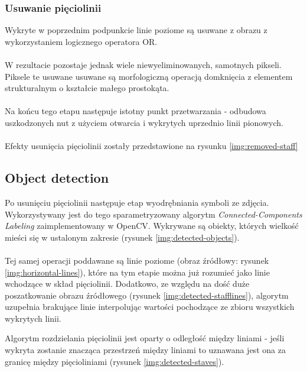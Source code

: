\documentclass[12pt, letterpaper]{article}
\begin{document}
\subsubsection{Usuwanie pięciolinii}
\label{subsec:staff-removal}
Wykryte w poprzednim podpunkcie linie poziome są usuwane z obrazu
z wykorzystaniem logicznego operatora OR.
\\
\\
W rezultacie pozostaje jednak wiele niewyeliminowanych, samotnych pikseli.
Piksele te usuwane usuwane są morfologiczną operacją domknięcia
z elementem strukturalnym o kształcie małego prostokąta.
\\
\\
Na końcu tego etapu następuje istotny punkt przetwarzania -
odbudowa uszkodzonych nut z użyciem otwarcia i wykrytych uprzednio linii pionowych.
\\
\\
Efekty usunięcia pięciolinii zostały przedstawione na
rysunku \ref{img:removed-staff}

\subsection{Object detection}
\label{sec:detection}
Po usunięciu pięciolinii następuje etap wyodrębniania symboli ze zdjęcia.
Wykorzystywany jest do tego sparametryzowany algorytm \emph{Connected-Components Labeling}
zaimplementowany w OpenCV.
Wykrywane są obiekty, których wielkość mieści się w ustalonym zakresie (rysunek \ref{img:detected-objects}).
\\
\\
Tej samej operacji poddawane są linie poziome (obraz źródłowy: rysunek \ref{img:horizontal-lines}),
które na tym etapie można już rozumieć jako linie wchodzące w skład pięciolinii.
Dodatkowo, ze względu na dość duże poszatkowanie obrazu źródłowego (rysunek \ref{img:detected-stafflines}),
algorytm uzupełnia brakujące linie interpolując wartości pochodzące ze
zbioru wszystkich wykrytych linii.

Algorytm rozdzielania pięciolinii jest oparty o odległość
między liniami - jeśli wykryta zostanie znacząca przestrzeń między liniami
to uznawana jest ona za granicę między pięcioliniami (rysunek \ref{img:detected-staves}).
\end{document}
